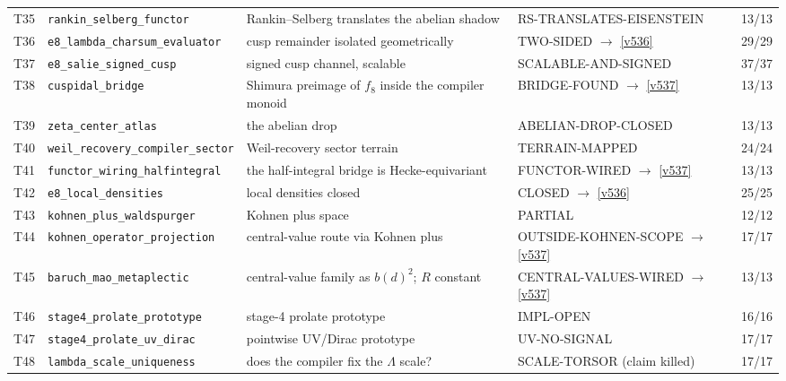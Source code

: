 \documentclass[11pt,a4paper]{article}
\begin{document}
{\begin{xltabular}{\linewidth}{@{}p{0.95cm} >{\raggedright\arraybackslash}p{3.1cm} Y >{\raggedright\scriptsize\arraybackslash}p{3.35cm} p{1.15cm}@{}}
T35 & \texttt{\scriptsize rankin\_\allowbreak selberg\_\allowbreak functor} & Rankin--Selberg translates the abelian shadow & RS-TRANSLATES-EISENSTEIN & 13/13\\
T36 & \texttt{\scriptsize e8\_\allowbreak lambda\_\allowbreak charsum\_\allowbreak evaluator} & cusp remainder isolated geometrically & TWO-SIDED $\to$ \vref{v536} & 29/29\\
T37 & \texttt{\scriptsize e8\_\allowbreak salie\_\allowbreak signed\_\allowbreak cusp} & signed cusp channel, scalable & SCALABLE-AND-SIGNED & 37/37\\
T38 & \texttt{\scriptsize cuspidal\_\allowbreak bridge} & Shimura preimage of $f_8$ inside the compiler monoid & BRIDGE-FOUND $\to$ \vref{v537} & 13/13\\
T39 & \texttt{\scriptsize zeta\_\allowbreak center\_\allowbreak atlas} & the abelian drop & ABELIAN-DROP-CLOSED & 13/13\\
T40 & \texttt{\scriptsize weil\_\allowbreak recovery\_\allowbreak compiler\_\allowbreak sector} & Weil-recovery sector terrain & TERRAIN-MAPPED & 24/24\\
T41 & \texttt{\scriptsize functor\_\allowbreak wiring\_\allowbreak halfintegral} & the half-integral bridge is Hecke-equivariant & FUNCTOR-WIRED $\to$ \vref{v537} & 13/13\\
T42 & \texttt{\scriptsize e8\_\allowbreak local\_\allowbreak densities} & local densities closed & CLOSED $\to$ \vref{v536} & 25/25\\
T43 & \texttt{\scriptsize kohnen\_\allowbreak plus\_\allowbreak waldspurger} & Kohnen plus space & PARTIAL & 12/12\\
T44 & \texttt{\scriptsize kohnen\_\allowbreak operator\_\allowbreak projection} & central-value route via Kohnen plus & OUTSIDE-KOHNEN-SCOPE $\to$ \vref{v537} & 17/17\\
T45 & \texttt{\scriptsize baruch\_\allowbreak mao\_\allowbreak metaplectic} & central-value family as $b(d)^2$; $R$ constant & CENTRAL-VALUES-WIRED $\to$ \vref{v537} & 13/13\\
T46 & \texttt{\scriptsize stage4\_\allowbreak prolate\_\allowbreak prototype} & stage-4 prolate prototype & IMPL-OPEN & 16/16\\
T47 & \texttt{\scriptsize stage4\_\allowbreak prolate\_\allowbreak uv\_\allowbreak dirac} & pointwise UV/Dirac prototype & UV-NO-SIGNAL & 17/17\\
T48 & \texttt{\scriptsize lambda\_\allowbreak scale\_\allowbreak uniqueness} & does the compiler fix the $\Lambda$ scale? & SCALE-TORSOR (claim killed) & 17/17\\

\end{xltabular}}
\end{document}
